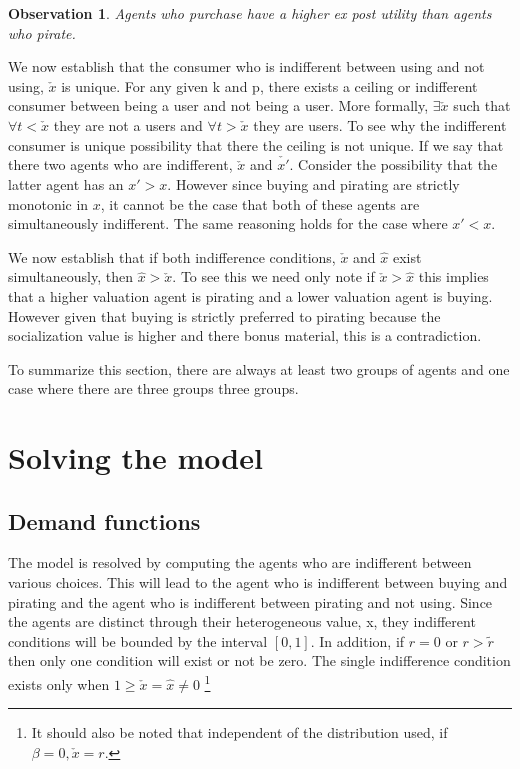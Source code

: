 \documentclass{article}
\newtheorem{observation}{Observation}
\begin{document}
\begin{observation}
Agents who purchase have a higher ex post utility than agents who pirate.
\end{observation}

We now establish that the consumer who is indifferent between using and not using, $\check{x}$ is unique. For any given k and p, there exists a ceiling or indifferent consumer between being a user and not being a user. More formally, $\exists \check{x}$ such that $\forall t < \check{x}$ they are not a users and $\forall t> \check{x}$ they are users. To see why the indifferent consumer is unique possibility that there the ceiling is not unique. If we say that there two agents who are indifferent, $\check{x} $ and $\check{x'}$. Consider the possibility that the latter agent has an $x'>x$. However since buying and pirating are  strictly monotonic in $x$, it cannot be the case that both of these agents are simultaneously indifferent. The same reasoning holds for the case where $x'<x$.

We now establish that if both indifference conditions, $\check{x}$ and $\hat{x}$ exist simultaneously, then $\hat{x}>\check{x}$. To see this we need only note if $\check{x}>\hat{x}$ this implies that a higher valuation agent is pirating and a lower valuation agent is buying. However given that buying is strictly preferred to pirating because the socialization value is higher and there bonus material, this is a contradiction. 

To summarize this section, there are always at least two groups of agents and one case where there are three groups three groups. 

\section{Solving the model}

\subsection{Demand functions}

The model is resolved by computing the agents who are indifferent between various choices. This will lead to the agent who is indifferent between buying and pirating and the agent who is indifferent between pirating and not using. Since the agents are distinct through their heterogeneous value, x, they indifferent conditions will be bounded by the interval $[0,1]$. In addition, if $r = 0$ or $r>\tilde{r}$ then only one condition will exist or not be zero. The single indifference condition exists only when $1 \geq \check{x}=\hat{x} \neq 0$ \footnote{It should also be noted that independent of the distribution used, if $\beta = 0, \check{x}=r$. }
\end{document}
